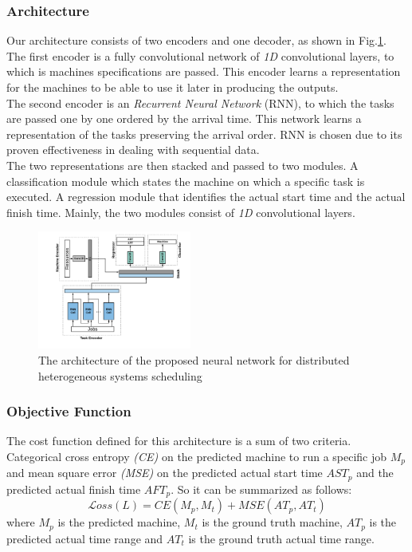 \documentclass[twocolumn,11pt]{IEEEtran}
\begin{document}
\subsubsection{Architecture}
Our architecture consists of two encoders and one decoder, as shown in Fig.\ref{fig:nn}. \\
The first encoder is a fully convolutional network of \emph{1D} convolutional layers, to which is machines specifications are passed. This encoder learns a representation for the machines to be able to use it later in producing the outputs. \\
The second encoder is an \emph{Recurrent Neural Network} (RNN)\cite{chung2014empirical}, to which the tasks are passed one by one ordered by the arrival time. This network learns a representation of the tasks preserving the arrival order. RNN is chosen due to its proven effectiveness in dealing with sequential data. \\
The two representations are then stacked and passed to two modules. A classification module which states the machine on which a specific task is executed. A regression module that identifies the actual start time and the actual finish time. Mainly, the two modules consist of \emph{1D} convolutional layers.
    
\begin{figure}[hp]
    \centering
    \includegraphics[width=0.45\textwidth]{sched_nn}
    \caption{The architecture of the proposed neural network for distributed heterogeneous systems scheduling}
    \label{fig:nn}
\end{figure}
    
\subsubsection{Objective Function}
The cost function defined for this architecture is a sum of two criteria. Categorical cross entropy \emph{(CE)} on the predicted machine to run a specific job $M_p$ and mean square error \emph{(MSE)} on the predicted actual start time $AST_p$ and the predicted actual finish time $AFT_p$. So it can be summarized as follows:
\begin{equation}
\mathcal Loss(L) = CE(M_p, M_t) + MSE(AT_p, AT_t)
\end{equation}
where $M_p$ is the predicted machine, $M_t$ is the ground truth machine, $AT_p$ is the predicted actual time range and $AT_t$ is the ground truth actual time range.
\end{document}
